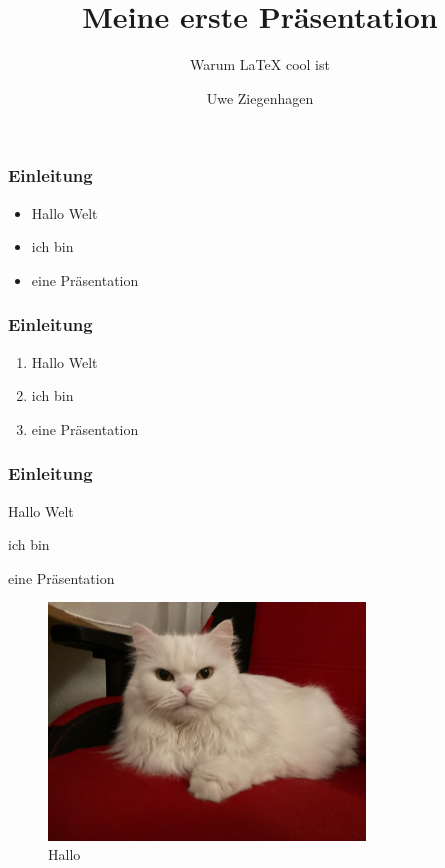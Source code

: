 \documentclass[12pt,ngerman]{beamer}
\title{Meine erste Präsentation}
\author{Uwe Ziegenhagen}
\subtitle{Warum LaTeX cool ist}
\institute{Dante e.V.}
\begin{document}
\begin{frame}

\maketitle


\end{frame}

\begin{frame}\transdissolve
\frametitle{Einleitung}

\begin{itemize}
\item Hallo Welt
\item ich bin 
\item eine Präsentation
\end{itemize}


\end{frame}

\begin{frame}
\frametitle{Einleitung}

\begin{enumerate}
\item Hallo Welt
\item ich bin 
\item eine Präsentation
\end{enumerate}


\end{frame}

\begin{frame}
\frametitle{Einleitung}

\begin{description}[<+->]
\item [Apfel] Hallo Welt
\item [Birne]  ich bin 
\item [Pflaume] eine Präsentation
\end{description}


\end{frame}

\begin{frame}

\begin{figure}
\begin{center}
\includegraphics[width=0.75\textwidth]{Bilder/Katze}
\caption{Hallo}
\end{center}
\end{figure}

\end{frame}
\end{document}
